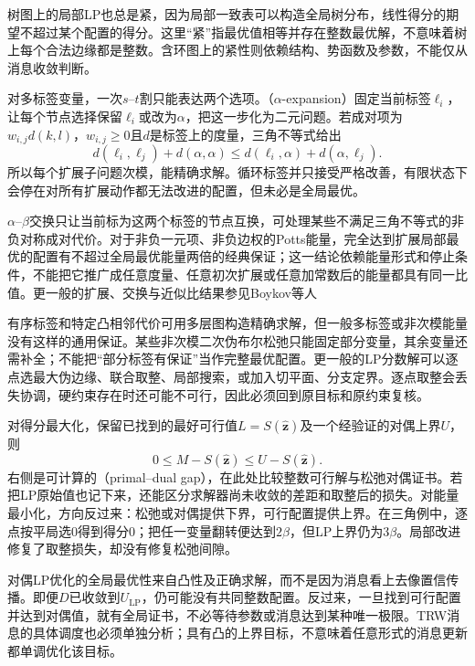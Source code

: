 树图上的局部LP也总是紧，因为局部一致表可以构造全局树分布，线性得分的期望不超过某个配置的得分。这里“紧”指最优值相等并存在整数最优解，不意味着树上每个合法边缘都是整数。含环图上的紧性则依赖结构、势函数及参数，不能仅从消息收敛判断。

对多标签变量，一次$s$--$t$割只能表达两个选项。（$\alpha$-expansion）固定当前标签$\ell_i$，让每个节点选择保留$\ell_i$或改为$\alpha$，把这一步化为二元问题。若成对项为$w_{i,j}d(k,l)$，$w_{i,j}\geq0$且$d$是标签上的度量，三角不等式给出
\[
  d(\ell_i,\ell_j)+d(\alpha,\alpha)
    \leq d(\ell_i,\alpha)+d(\alpha,\ell_j).
\]
所以每个扩展子问题次模，能精确求解。循环标签并只接受严格改善，有限状态下会停在对所有扩展动作都无法改进的配置，但未必是全局最优。

$\alpha$--$\beta$交换只让当前标为这两个标签的节点互换，可处理某些不满足三角不等式的非负对称成对代价。对于非负一元项、非负边权的Potts能量，完全达到扩展局部最优的配置有不超过全局最优能量两倍的经典保证；这一结论依赖能量形式和停止条件，不能把它推广成任意度量、任意初次扩展或任意加常数后的能量都具有同一比值。更一般的扩展、交换与近似比结果参见Boykov等人

有序标签和特定凸相邻代价可用多层图构造精确求解，但一般多标签或非次模能量没有这样的通用保证。某些非次模二次伪布尔松弛只能固定部分变量，其余变量还需补全；不能把“部分标签有保证”当作完整最优配置。更一般的LP分数解可以逐点选最大伪边缘、联合取整、局部搜索，或加入切平面、分支定界。逐点取整会丢失协调，硬约束存在时还可能不可行，因此必须回到原目标和原约束复核。

对得分最大化，保留已找到的最好可行值$L=S(\widehat{\bm z})$及一个经验证的对偶上界$U$，则
\begin{equation}
  0\leq M-S(\widehat{\bm z})\leq U-S(\widehat{\bm z}).
  \label{eq:pgm-variational-gap}
\end{equation}
右侧是可计算的（primal--dual gap），在此处比较整数可行解与松弛对偶证书。若把LP原始值也记下来，还能区分求解器尚未收敛的差距和取整后的损失。对能量最小化，方向反过来：松弛或对偶提供下界，可行配置提供上界。在三角例中，逐点按平局选$0$得到得分$0$；把任一变量翻转便达到$2\beta$，但LP上界仍为$3\beta$。局部改进修复了取整损失，却没有修复松弛间隙。

对偶LP优化的全局最优性来自凸性及正确求解，而不是因为消息看上去像置信传播。即便$D$已收敛到$U_{\mathrm{LP}}$，仍可能没有共同整数配置。反过来，一旦找到可行配置并达到对偶值，就有全局证书，不必等待参数或消息达到某种唯一极限。TRW消息的具体调度也必须单独分析；具有凸的上界目标，不意味着任意形式的消息更新都单调优化该目标。

